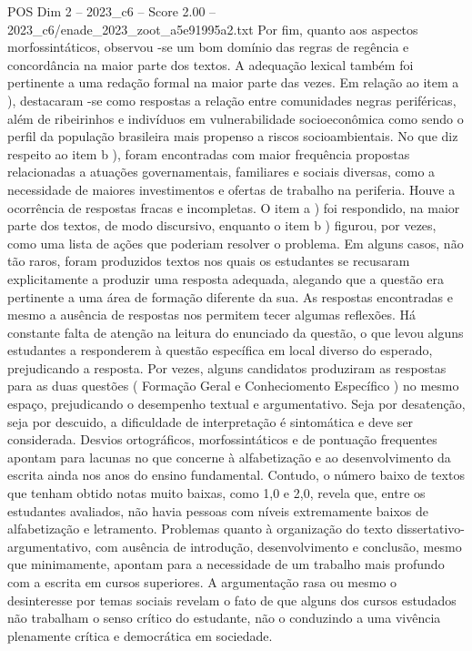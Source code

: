 \begin{textsample}{POS Dim 2 – 2023\_c6 – Score 2.00 – 2023\_c6/enade\_2023\_zoot\_a5e91995a2.txt}
Por fim, quanto aos aspectos morfossintáticos, observou -se um bom domínio das regras de regência e concordância na maior parte dos textos.
A adequação lexical também foi pertinente a uma redação formal na maior parte das vezes.
Em relação ao item a ), destacaram -se como respostas a relação entre comunidades negras periféricas, além de ribeirinhos e indivíduos em vulnerabilidade socioeconômica como sendo o perfil da população brasileira mais propenso a riscos socioambientais.
No que diz respeito ao item b ), foram encontradas com maior frequência propostas relacionadas a atuações governamentais, familiares e sociais diversas, como a necessidade de maiores investimentos e ofertas de trabalho na periferia.
Houve a ocorrência de respostas fracas e incompletas.
O item a ) foi respondido, na maior parte dos textos, de modo discursivo, enquanto o item b ) figurou, por vezes, como uma lista de ações que poderiam resolver o problema.
Em alguns casos, não tão raros, foram produzidos textos nos quais os estudantes se recusaram explicitamente a produzir uma resposta adequada, alegando que a questão era pertinente a uma área de formação diferente da sua.
As respostas encontradas e mesmo a ausência de respostas nos permitem tecer algumas reflexões.
Há constante falta de atenção na leitura do enunciado da questão, o que levou alguns estudantes a responderem à questão específica em local diverso do esperado, prejudicando a resposta.
Por vezes, alguns candidatos produziram as respostas para as duas questões ( Formação Geral e Conheciomento Específico ) no mesmo espaço, prejudicando o desempenho textual e argumentativo.
Seja por desatenção, seja por descuido, a dificuldade de interpretação é sintomática e deve ser considerada.
Desvios ortográficos, morfossintáticos e de pontuação frequentes apontam para lacunas no que concerne à alfabetização e ao desenvolvimento da escrita ainda nos anos do ensino fundamental.
Contudo, o número baixo de textos que tenham obtido notas muito baixas, como 1,0 e 2,0, revela que, entre os estudantes avaliados, não havia pessoas com níveis extremamente baixos de alfabetização e letramento.
Problemas quanto à organização do texto dissertativo-argumentativo, com ausência de introdução, desenvolvimento e conclusão, mesmo que minimamente, apontam para a necessidade de um trabalho mais profundo com a escrita em cursos superiores.
A argumentação rasa ou mesmo o desinteresse por temas sociais revelam o fato de que alguns dos cursos estudados não trabalham o senso crítico do estudante, não o conduzindo a uma vivência plenamente crítica e democrática em sociedade.

\end{textsample}
